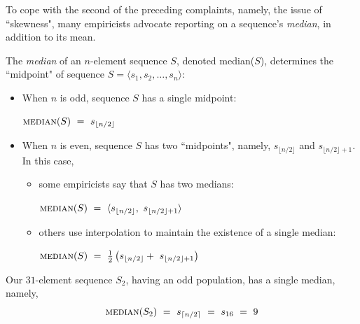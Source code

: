 \bigskip

To cope with the second of the preceding complaints, namely, the issue of ``skewness", many empiricists advocate reporting on a sequence's {\it median}, in addition to its mean.

\smallskip

\noindent
The {\em median} of an $n$-element sequence $S$, denoted {\sc median}($S$), determines 
the ``midpoint" of sequence $S = \langle s_1, s_2, \ldots, s_n \rangle$:

\smallskip

\begin{itemize}
\item
When $n$ is odd, sequence $S$ has a single midpoint:

\smallskip

\hspace*{.35in}
$\mbox{\sc median}(S)  \ = \ s_{\lfloor n/2 \rfloor}$

\medskip\item
When $n$ is even, sequence $S$ has two ``midpoints", namely, $s_{\lfloor n/2 \rfloor}$ and $s_{\lfloor n/2 \rfloor +1}$.  In this case,
  \begin{itemize}
  \item
some empiricists say that $S$ has two medians:

\smallskip

\hspace*{.35in}
$\mbox{\sc median}(S)  \ = \ \langle s_{\lfloor n/2 \rfloor}, \ s_{\lfloor n/2 \rfloor +1} \rangle$

  \medskip\item
others use interpolation to maintain the existence of a single median:

\smallskip

\hspace*{.35in}
$\mbox{\sc median}(S)  \ = \ {1 \over 2} \left(s_{\lfloor n/2 \rfloor} + \ s_{\lfloor n/2 \rfloor +1} \right)$
  \end{itemize}
\end{itemize}
Our $31$-element sequence $S_2$, having an odd population, has a single median, namely,
\[ \mbox{\sc median}(S_2) \ = \ s_{\lceil n/2 \rceil} \ = \ s_{16} \ = \ 9 \]

\bigskip

\noindent {}
\bigskip


